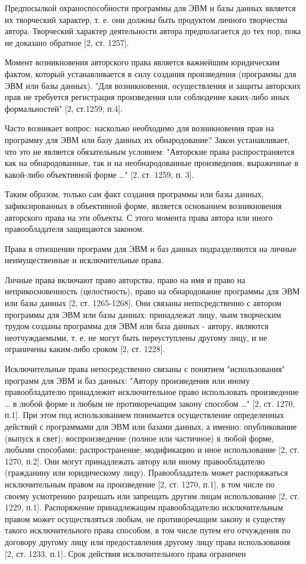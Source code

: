     Предпосылкой охраноспособности программы для ЭВМ и базы данных является их творческий характер, т. е. они должны быть продуктом личного творчества автора. Творческий характер деятельности автора предполагается до тех пор, пока не доказано обратное [2, ст. 1257].

    Момент возникновения авторского права является важнейшим юридическим фактом, который устанавливается в силу создания произведения (программы для ЭВМ или базы данных). "Для возникновения, осуществления и защиты авторских прав не требуется регистрация произведения или соблюдение каких-либо иных формальностей" [2, ст.1259, п.4].

    Часто возникает вопрос: насколько необходимо для возникновения прав на программу для ЭВМ или базу данных их обнародование? Закон устанавливает, что это не является обязательным условием: "Авторские права распространяется как на обнародованные, так и на необнародованные произведения, выраженные в какой-либо объективной форме …" [2, ст. 1259, п. 3].

    Таким образом, только сам факт создания программы или базы данных, зафиксированных в объективной форме, является основанием возникновения авторского права на эти объекты. С этого момента права автора или иного правообладателя защищаются законом.

    Права в отношении программ для ЭВМ и баз данных подразделяются на личные неимущественные и исключительные права.

    Личные права включают право авторства, право на имя и право на неприкосновенность (целостность), право на обнародование программы для ЭВМ или базы данных [2, ст. 1265-1268]. Они связаны непосредственно с автором программы для ЭВМ или базы данных: принадлежат лицу, чьим творческим трудом созданы программа для ЭВМ или база данных - автору, являются неотчуждаемыми, т. е. не могут быть переуступлены другому лицу, и не ограничены каким-либо сроком [2, ст. 1228].

    Исключительные права непосредственно связаны с понятием "использования" программ для ЭВМ и баз данных: "Автору произведения или иному правообладателю принадлежит исключительное право использовать произведение … в любой форме и любым не противоречащим закону способом …" [2, ст. 1270, п.1]. При этом под использованием понимается осуществление определенных действий с программами для ЭВМ или базами данных, а именно: опубликование (выпуск в свет); воспроизведение (полное или частичное) в любой форме, любыми способами; распространение; модификацию и иное использование [2, ст. 1270, п.2]. Они могут принадлежать автору или иному правообладателю (гражданину или юридическому лицу). Правообладатель может распоряжаться исключительным правом на произведение [2, ст. 1270, п.1], в том числе по своему усмотрению разрешать или запрещать другим лицам использование [2, ст. 1229, п.1]. Распоряжение принадлежащим правообладателю исключительным правом может осуществляться любым, не противоречащим закону и существу такого исключительного права способом, в том числе путем его отчуждения по договору другому лицу или предоставления другому лицу права использования [2, ст. 1233, п.1]. Срок действия исключительного права ограничен

